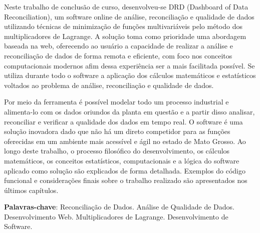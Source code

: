
\begin{resumo}

Neste trabalho de conclusão de curso, desenvolveu-se DRD (Dashboard of Data Reconciliation), um software online de análise, reconciliação e qualidade de dados utilizando técnicas de minimização de funções multivariáveis pelo método dos multiplicadores de Lagrange. A solução toma como prioridade uma abordagem baseada na web, oferecendo ao usuário a capacidade de realizar a análise e reconciliação de dados de forma remota e eficiente, com foco nos conceitos computacionais modernos afim dessa experiência ser a mais facilitada possível. Se utiliza durante todo o software a aplicação dos cálculos matemáticos e estatísticos voltados ao problema de análise, reconciliação e qualidade de dados. 

Por meio da ferramenta é possível modelar todo um processo industrial e alimenta-lo com os dados oriundos da planta em questão e a partir disso analisar, reconciliar e verificar a qualidade dos dados em tempo real. O software é uma solução inovadora dado que não há um direto competidor para as funções oferecidas em um ambiente mais acessível e ágil no estado de Mato Grosso. Ao longo deste trabalho, o processo filosófico do desenvolvimento, os cálculos matemáticos, os conceitos estatísticos, computacionais e a lógica do software aplicado como solução são explicados de forma detalhada. Exemplos do código funcional e considerações finais sobre o trabalho realizado são apresentados nos últimos capítulos.

 \vspace{\onelineskip}
 \noindent
 \textbf{Palavras-chave}: Reconciliação de Dados. Análise de Qualidade de Dados. Desenvolvimento Web. Multiplicadores de Lagrange. Desenvolvimento de Software. 
\end{resumo}

